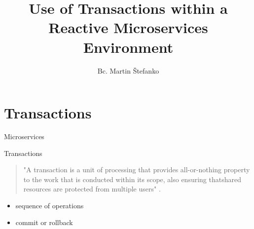 \documentclass{beamer}
\title{Use of Transactions within a Reactive Microservices Environment} %
\author{Bc. Martin Štefanko}
\begin{document}
  \frame{\maketitle}

        \section{Transactions}
        
    \begin{frame}{Microservices}
    
    
    \end{frame}

    \begin{frame}{Transactions}
    
     \begin{quotation}
         \begin{center}
             "A transaction is a unit of processing that provides all-or-nothing property to the work that is conducted within its scope, also ensuring thatshared resources are protected from multiple users" \cite{java_transaction_processing}.
         \end{center}
     \end{quotation}
     \Large
        \begin{itemize}
            \item sequence of operations
            \item commit or rollback
        \end{itemize}
        \hfill \break
        \hfill \break
        
    \end{frame}
    
\end{document}
